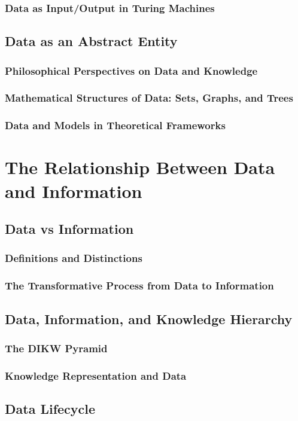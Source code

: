 \documentclass[12pt, oneside]{book}
\begin{document}
\subsubsection{Data as Input/Output in Turing Machines}
\subsection{Data as an Abstract Entity}
\subsubsection{Philosophical Perspectives on Data and Knowledge}
\subsubsection{Mathematical Structures of Data: Sets, Graphs, and Trees}
\subsubsection{Data and Models in Theoretical Frameworks}

\section{The Relationship Between Data and Information}
\subsection{Data vs Information}
\subsubsection{Definitions and Distinctions}
\subsubsection{The Transformative Process from Data to Information}
\subsection{Data, Information, and Knowledge Hierarchy}
\subsubsection{The DIKW Pyramid}
\subsubsection{Knowledge Representation and Data}
\subsection{Data Lifecycle}
\end{document}
